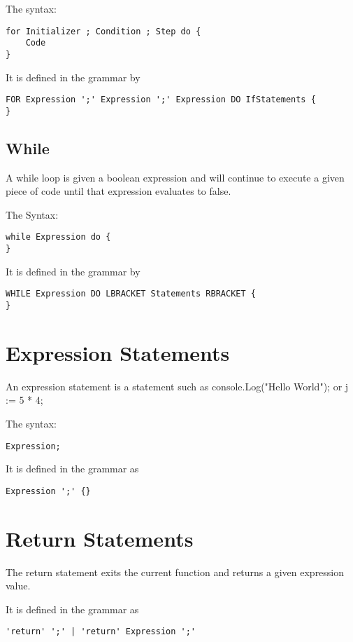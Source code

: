 \documentclass[]{final_report}
\begin{document}
The syntax: \begin{verbatim}
for Initializer ; Condition ; Step do {
	Code
}
\end{verbatim}

It is defined in the grammar by \begin{verbatim}
FOR Expression ';' Expression ';' Expression DO IfStatements {
}
\end{verbatim}

\subsection{While}

A while loop is given a boolean expression and will continue to execute a given piece of code until that expression evaluates to false.

The Syntax: \begin{verbatim}
while Expression do {
}
\end{verbatim}

It is defined in the grammar by \begin{verbatim}
WHILE Expression DO LBRACKET Statements RBRACKET {
} 
\end{verbatim}

\section{Expression Statements}

An expression statement is a statement such as console.Log("Hello World"); or j := 5 * 4;

The syntax: \begin{verbatim}Expression;\end{verbatim}

It is defined in the grammar as \begin{verbatim}Expression ';' {}\end{verbatim}

\section{Return Statements}

The return statement exits the current function and returns a given expression value. 

It is defined in the grammar as
\begin{verbatim}
'return' ';' | 'return' Expression ';'
\end{verbatim}
\end{document}

